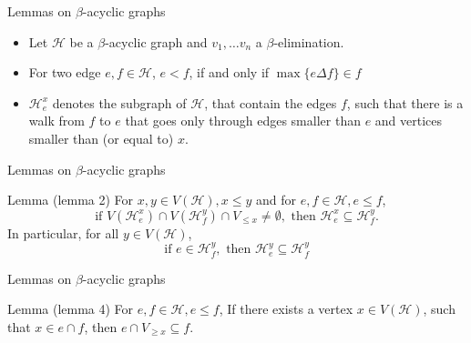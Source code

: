 \begin{frame}[t]{Lemmas on $\beta$-acyclic graphs}
	\begin{itemize}[<+->]
	\item Let $\mathcal{H}$ be a $\beta$-acyclic graph and $v_1, \dots v_n$ a $\beta$-elimination.
		\item For two edge $e, f \in \mathcal{H}$, $e < f$, if and only if $\max\{e \Delta f\}\in f$
		\item {\color{blue}$\mathcal{H}^x_e$} denotes the subgraph of $\mathcal{H}$, that contain the edges $f$, such that there is a walk from $f$ to $e$ that goes only through edges smaller than $e$ and vertices smaller than (or equal to) $x$.
	\end{itemize}
	\begin{figure}[htpb]
		\centering
		\resizebox{.6\columnwidth}{!}{
		
		}
		\label{fig:name}
	\end{figure}
\end{frame}
\begin{frame}[t]{Lemmas on $\beta$-acyclic graphs}
	\begin{block}{Lemma (lemma 2)}
		For $x,y \in V(\mathcal{H}), x \leq y$ and for $e, f \in \mathcal{H}, e \leq f$,
			$$\text{if } V(\mathcal{H}^x_e)\cap V(\mathcal{H}^y_f)\cap V_{\leq x} \neq \emptyset,
			\text{ then } \mathcal{H}^x_e \subseteq \mathcal{H}^y_f.$$
			In particular, for all $y \in V(\mathcal{H})$,
		$$\text{if } e \in \mathcal{H}^y_f, \text{ then } \mathcal{H}^y_e \subseteq \mathcal{H}^y_f$$
	\end{block}
\end{frame}

\begin{frame}[t]{Lemmas on $\beta$-acyclic graphs}
	\begin{block}{Lemma (lemma 4)}
		For $e, f \in \mathcal{H}, e\leq f$, If there exists a vertex $x \in V(\mathcal{H})$, such that $x \in e \cap f$, then $e \cap V_{\geq x} \subseteq f$.
	\end{block}
\end{frame}


